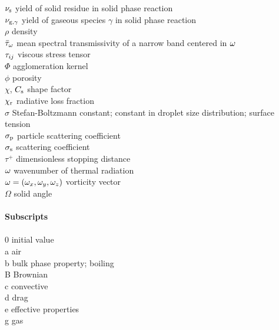 \begin{tabbing}
$\nu_{\rm s}$             \> yield of solid residue in solid phase reaction \\
$\nu_{{\rm g},\gamma}$    \> yield of gaseous species $\gamma$ in solid phase reaction \\
$\rho$                    \> density \\
$\bar{\tau}_{\omega}$        \> mean spectral transmissivity of a narrow band centered in $\omega$ \\
$\mathbf{\tau}_{ij}$              \> viscous stress tensor \\
$\Phi$                    \> agglomeration kernel \\
$\phi$                    \> porosity \\
$\chi$, $C_{\rm s}$       \> shape factor \\
$\chi_{\rm r}$            \> radiative loss fraction \\
$\sigma$                  \> Stefan-Boltzmann constant; constant in droplet size distribution; surface tension \\
$\sigma_{\rm p}$          \> particle scattering coefficient \\
$\sigma_{\rm s}$          \> scattering coefficient \\
$\tau^+$                  \> dimensionless stopping distance \\
$\omega$                     \> wavenumber of thermal radiation \\
${\mathbf{\omega}}=(\omega_x,\omega_y,\omega_z)$    \> vorticity vector \\
$\Omega$                  \> solid angle \\
\hspace{0.1in}            \> \\
{\bf Subscripts}          \> \\
\hspace{0.1in}            \> \\
0                         \> initial value \\
a                         \> air \\
b                         \> bulk phase property; boiling \\
B                         \> Brownian \\
c                         \> convective \\
d                         \> drag \\
e                         \> effective properties \\
g                         \> gas \\

\end{tabbing}
